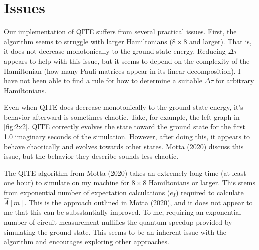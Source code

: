 \documentclass{article}
\newcounter{example}[section]
\begin{document}
\section{Issues}
\label{sec:issues}
Our implementation of QITE suffers from several practical issues. %
First, the algorithm seems to struggle with larger Hamiltonians ($8 \times 8$ and larger).
That is, it does not decrease monotonically to the ground state energy.
Reducing $\Delta \tau$ appears to help with this issue, but it seems to depend on the complexity of the Hamiltonian (how many Pauli matrices appear in its linear decomposition).
I have not been able to find a rule for how to determine a suitable $\Delta \tau$ for arbitrary Hamiltonians.

Even when QITE does decrease monotonically to the ground state energy, it's behavior afterward is sometimes chaotic.
Take, for example, the left graph in \cref{fig:2x2}.
QITE correctly evolves the state toward the ground state for the first 1.0 imaginary seconds of the simulation.
However, after doing this, it appears to behave chaotically and evolves towards other states.
Motta (2020) discuss this issue, but the behavior they describe sounds less chaotic.

The QITE algorithm from Motta (2020) takes an extremely long time (at least one hour) to simulate on my machine for $8 \times 8$ Hamiltonians or larger.
This stems from exponential number of expectation calculations ($e_I$) required to calculate $\hat{A}[m]$.
This is the approach outlined in Motta (2020), and it does not appear to me that this can be subsstantially improved.
To me, requiring an exponential number of circuit measurement nullifies the quantum speedup provided by simulating the ground state.
This seems to be an inherent issue with the algorithm and encourages exploring other approaches.
\end{document}
